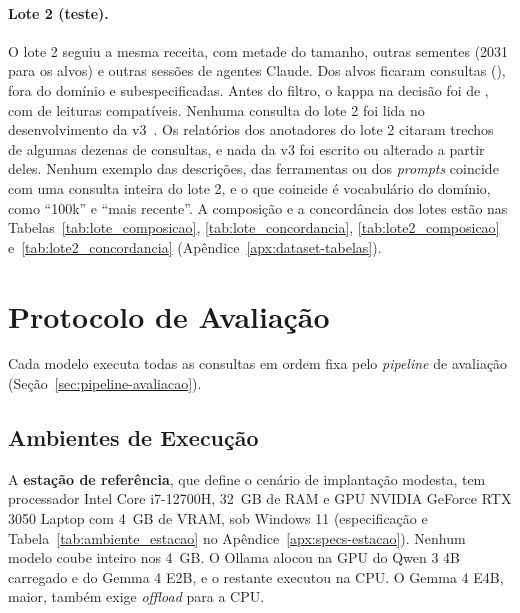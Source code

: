 \paragraph{Lote 2 (teste).} O lote 2 seguiu a mesma receita, com metade do tamanho, outras sementes (2031 para os alvos) e outras sessões de agentes Claude. Dos  alvos ficaram  consultas (),  fora do domínio e  subespecificadas. Antes do filtro, o kappa na decisão foi de , com  de leituras compatíveis. Nenhuma consulta do lote 2 foi lida no desenvolvimento da v3~\cite{dwork2015reusable}. Os relatórios dos anotadores do lote 2 citaram trechos de algumas dezenas de consultas, e nada da v3 foi escrito ou alterado a partir deles. Nenhum exemplo das descrições, das ferramentas ou dos \textit{prompts} coincide com uma consulta inteira do lote 2, e o que coincide é vocabulário do domínio, como ``100k'' e ``mais recente''. A composição e a concordância dos lotes estão nas Tabelas~\ref{tab:lote_composicao}, \ref{tab:lote_concordancia}, \ref{tab:lote2_composicao} e~\ref{tab:lote2_concordancia} (Apêndice~\ref{apx:dataset-tabelas}).

\section{Protocolo de Avaliação}
\label{sec:protocolo}

Cada modelo executa todas as consultas em ordem fixa pelo \textit{pipeline} de avaliação (Seção~\ref{sec:pipeline-avaliacao}).

\subsection{Ambientes de Execução}
\label{sec:ambiente}
\label{sec:config-experimental}

A \textbf{estação de referência}, que define o cenário de implantação modesta, tem processador Intel Core i7-12700H, 32~GB de RAM e GPU NVIDIA GeForce RTX 3050 Laptop com 4~GB de VRAM, sob Windows 11 (especificação e Tabela~\ref{tab:ambiente_estacao} no Apêndice~\ref{apx:specs-estacao}). Nenhum modelo coube inteiro nos 4~GB. O Ollama alocou na GPU  do Qwen 3 4B carregado e  do Gemma 4 E2B, e o restante executou na CPU. O Gemma 4 E4B, maior, também exige \textit{offload} para a CPU.

